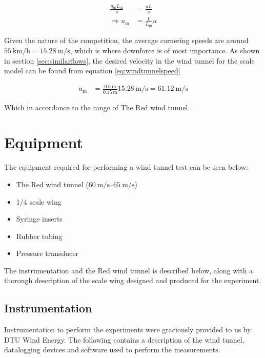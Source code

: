     \begin{align}
      \frac{u_\text{m} L_\text{m}}{\nu} &= \frac{u L}{\nu} \nonumber \\
      \Rightarrow u_\text{m} &= \frac{L}{L_\text{m}} u \label{eq:windtunnelspeed}
    \end{align}

    Given the nature of the competition, the average cornering speeds are around $\SI{55}{\kilo \meter \per \hour} = \SI{15.28}{\metre\per\second}$, which is where downforce is of most importance. As shown in section \ref{sec:similarflows}, the desired velocity in the wind tunnel for the scale model can be found from equation \ref{eq:windtunnelspeed}

    \begin{align*}
      u_\text{m} &= \frac{\SI{0.6}{\metre}}{\SI{0.15}{\metre}} \SI{15.28}{\metre\per\second} = \SI{61.12}{\metre\per\second}
    \end{align*}

    Which in accordance to the range of The Red wind tunnel.

\section{Equipment}

  The equipment required for performing a wind tunnel test can be seen below:
  \begin{itemize}
    \item The Red wind tunnel ($\SIrange{60}{65}{\metre\per\second}$)
    \item 1/4 scale wing
    \item Syringe inserts
    \item Rubber tubing
    \item Pressure transducer
  \end{itemize}

  The instrumentation and the Red wind tunnel is described below, along with a thorough description of the scale wing designed and produced for the experiment.

  \subsection{Instrumentation}

    Instrumentation to perform the experiments were graciously provided to us by DTU Wind Energy. The following contains a description of the wind tunnel, datalogging devices and software used to perform the measurements.


